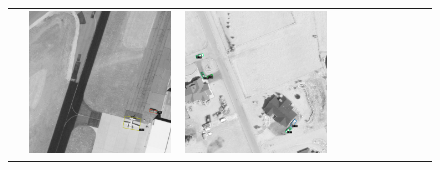 \begin{figure}[h!]
\begin{tabularx}{\textwidth}{c|*{9}{X}}
    &  \includegraphics[trim={650pt 120pt 170pt 720pt},clip,width=\linewidth]{images/015Results/03ablation/comp_images/ir/487.png}
    & \includegraphics[trim={230pt 200pt 680pt 725pt},clip,width=\linewidth]{images/015Results/03ablation/comp_images/ir/509.png}

\end{tabularx}
\end{figure}
